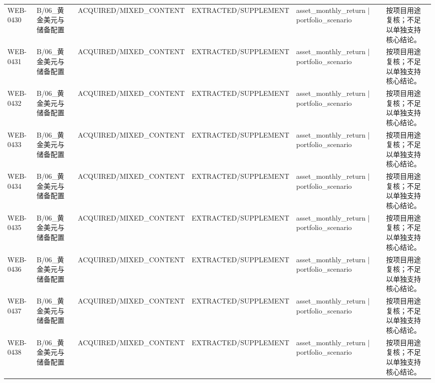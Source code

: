 \begin{landscape}
\begin{longtable}{p{1.8cm}p{2.6cm}p{2.6cm}p{2.6cm}p{4.8cm}p{7.2cm}}
WEB-0430 & B/\allowbreak{}06\_\allowbreak{}黄金美元与储备配置 & ACQUIRED/\allowbreak{}MIXED\_\allowbreak{}CONTENT & EXTRACTED/\allowbreak{}SUPPLEMENT & asset\_\allowbreak{}monthly\_\allowbreak{}return | portfolio\_\allowbreak{}scenario & 按项目用途复核；不足以单独支持核心结论。\\
WEB-0431 & B/\allowbreak{}06\_\allowbreak{}黄金美元与储备配置 & ACQUIRED/\allowbreak{}MIXED\_\allowbreak{}CONTENT & EXTRACTED/\allowbreak{}SUPPLEMENT & asset\_\allowbreak{}monthly\_\allowbreak{}return | portfolio\_\allowbreak{}scenario & 按项目用途复核；不足以单独支持核心结论。\\
WEB-0432 & B/\allowbreak{}06\_\allowbreak{}黄金美元与储备配置 & ACQUIRED/\allowbreak{}MIXED\_\allowbreak{}CONTENT & EXTRACTED/\allowbreak{}SUPPLEMENT & asset\_\allowbreak{}monthly\_\allowbreak{}return | portfolio\_\allowbreak{}scenario & 按项目用途复核；不足以单独支持核心结论。\\
WEB-0433 & B/\allowbreak{}06\_\allowbreak{}黄金美元与储备配置 & ACQUIRED/\allowbreak{}MIXED\_\allowbreak{}CONTENT & EXTRACTED/\allowbreak{}SUPPLEMENT & asset\_\allowbreak{}monthly\_\allowbreak{}return | portfolio\_\allowbreak{}scenario & 按项目用途复核；不足以单独支持核心结论。\\
WEB-0434 & B/\allowbreak{}06\_\allowbreak{}黄金美元与储备配置 & ACQUIRED/\allowbreak{}MIXED\_\allowbreak{}CONTENT & EXTRACTED/\allowbreak{}SUPPLEMENT & asset\_\allowbreak{}monthly\_\allowbreak{}return | portfolio\_\allowbreak{}scenario & 按项目用途复核；不足以单独支持核心结论。\\
WEB-0435 & B/\allowbreak{}06\_\allowbreak{}黄金美元与储备配置 & ACQUIRED/\allowbreak{}MIXED\_\allowbreak{}CONTENT & EXTRACTED/\allowbreak{}SUPPLEMENT & asset\_\allowbreak{}monthly\_\allowbreak{}return | portfolio\_\allowbreak{}scenario & 按项目用途复核；不足以单独支持核心结论。\\
WEB-0436 & B/\allowbreak{}06\_\allowbreak{}黄金美元与储备配置 & ACQUIRED/\allowbreak{}MIXED\_\allowbreak{}CONTENT & EXTRACTED/\allowbreak{}SUPPLEMENT & asset\_\allowbreak{}monthly\_\allowbreak{}return | portfolio\_\allowbreak{}scenario & 按项目用途复核；不足以单独支持核心结论。\\
WEB-0437 & B/\allowbreak{}06\_\allowbreak{}黄金美元与储备配置 & ACQUIRED/\allowbreak{}MIXED\_\allowbreak{}CONTENT & EXTRACTED/\allowbreak{}SUPPLEMENT & asset\_\allowbreak{}monthly\_\allowbreak{}return | portfolio\_\allowbreak{}scenario & 按项目用途复核；不足以单独支持核心结论。\\
WEB-0438 & B/\allowbreak{}06\_\allowbreak{}黄金美元与储备配置 & ACQUIRED/\allowbreak{}MIXED\_\allowbreak{}CONTENT & EXTRACTED/\allowbreak{}SUPPLEMENT & asset\_\allowbreak{}monthly\_\allowbreak{}return | portfolio\_\allowbreak{}scenario & 按项目用途复核；不足以单独支持核心结论。\\

\end{longtable}
\end{landscape}
